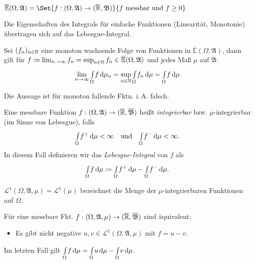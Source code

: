 \documentclass{cheat-sheet}
\newcommand{\ER}{\overline\R} %
\newcommand{\Alg}{\mathfrak{A}} %
\newcommand{\Bor}{\mathfrak{B}} %
\newcommand{\E}{\mathbb{E}} %
\newcommand{\Leb}{\mathcal{L}} %
\newcommand{\IntOmu}[1]{\Int{\Omega}{}{#1}{\mu}} %
\begin{document}
\begin{satz}
  $\overline{\E}(\Omega, \Alg) = \Set{ f : (\Omega, \Alg) \to (\ER, \Bor) }{ f \text{ messbar und } f \geq 0 }$
\end{satz}

\begin{satz}
  Die Eigenschaften des Integrals für einfache Funktionen (Linearität, Monotonie) übertragen sich auf das Lebesgue-Integral.
\end{satz}

\begin{satz}
  Sei $(f_n)_{n \in \mathbb{N}}$ eine monoton wachsende Folge von Funktionen in $\overline{\E}(\Omega, \Alg)$, dann gilt für $f \coloneqq \lim_{n \to \infty} f_n = \sup_{n \in \N} f_n \in \overline{\E}(\Omega, \Alg)$ und jedes Maß $\mu$ auf $\Alg$:
  \[ \lim_{n \to \infty} \IntOmu f_n = \sup_{n \in \N} \IntOmu{f_n} = \IntOmu{f} \]
\end{satz}

\begin{bem}
  Die Aussage ist für monoton fallende Fktn. i.\,A. falsch.
\end{bem}

\begin{defn}
  Eine messbare Funktion $f : (\Omega, \Alg) \to (\ER, \overline{\Bor})$ heißt \emph{integrierbar} bzw. $\mu$-integrierbar (im Sinne von Lebesgue), falls
  \[ \IntOmu{f^+} < \infty \quad \text{und} \quad \IntOmu{f^-} < \infty. \]
  In diesem Fall definieren wir das \emph{Lebesgue-Integral} von $f$ als
  \[ \IntOmu{f} \coloneqq \IntOmu{f^+} - \IntOmu{f^-}. \]
\end{defn}

\begin{nota}
  $\Leb^1(\Omega, \Alg, \mu) = \Leb^1(\mu)$ bezeichnet die Menge der $\mu$-integrierbaren Funktionen auf $\Omega$.
\end{nota}

\begin{satz}
  Für eine messbare Fkt. $f : (\Omega, \Alg, \mu) \to (\ER, \overline{\Bor})$ sind äquivalent:
  \begin{itemize}
    \item Es gibt nicht negative $u, v \in \Leb^1(\Omega, \Alg, \mu)$ mit $f = u - v$.
  \end{itemize}
  Im letzten Fall gilt $\IntOmu{f} = \IntOmu{u} - \IntOmu{v}$.
\end{satz}
\end{document}
